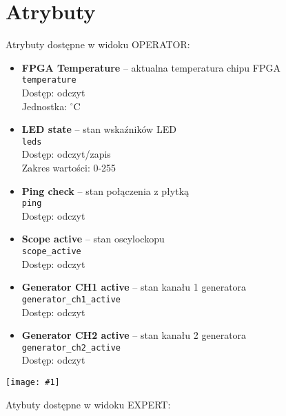 \documentclass[12pt,a4paper]{article}
\newcommand{\screenshot}[1]{\begin{minipage}[c]{\textwidth}\texttt{[image: \#1]}\end{minipage}}
\begin{document}
	\section{Atrybuty}
	Atrybuty dostępne w widoku OPERATOR:
	\begin{itemize}
		\item \textbf{FPGA Temperature} -- aktualna temperatura chipu FPGA\\
			  \texttt{temperature}\\
			  Dostęp: odczyt\\
			  Jednostka: $^{\circ}$C
		\item \textbf{LED state} -- stan wskaźników LED\\
			  \texttt{leds}\\
			  Dostęp: odczyt/zapis\\
			  Zakres wartości: 0-255
		\item \textbf{Ping check} -- stan połączenia z płytką\\
			  \texttt{ping}\\
			  Dostęp: odczyt
		\item \textbf{Scope active} -- stan oscylockopu\\
			  \texttt{scope\_active}\\
			  Dostęp: odczyt
		\item \textbf{Generator CH1 active} -- stan kanału 1 generatora\\
			  \texttt{generator\_ch1\_active}\\
			  Dostęp: odczyt
		\item \textbf{Generator CH2 active} -- stan kanału 2 generatora\\
			  \texttt{generator\_ch2\_active}\\
			  Dostęp: odczyt
	\end{itemize}
	\screenshot{screenshots/operator.png}
	Atybuty dostępne w widoku EXPERT:
\end{document}
